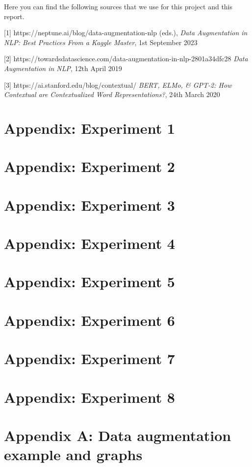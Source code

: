 \documentclass{article}
\begin{document}
Here you can find the following sources that we use for this project and this report.
\medskip


{
\small


[1] https://neptune.ai/blog/data-augmentation-nlp 
(eds.), {\it Data Augmentation in NLP: Best Practices From a Kaggle Master}, 1st September 2023



[2] https://towardsdatascience.com/data-augmentation-in-nlp-2801a34dfc28 {\it Data Augmentation in NLP},  12th April 2019


[3] https://ai.stanford.edu/blog/contextual/ {\it BERT, ELMo, & GPT-2: How Contextual are Contextualized Word Representations?},  24th March 2020
}

\newpage

\section{Appendix: Experiment 1}
\section{Appendix: Experiment 2}
\section{Appendix: Experiment 3}
\section{Appendix: Experiment 4}
\section{Appendix: Experiment 5}
\section{Appendix: Experiment 6}
\section{Appendix: Experiment 7}
\section{Appendix: Experiment 8}



\section{Appendix A: Data augmentation example and graphs}
\end{document}
